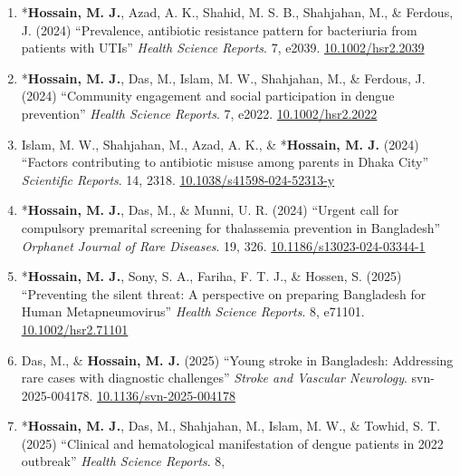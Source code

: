 \documentclass[
  11pt,
  letterpaper,
  DIV=11,
  numbers=noendperiod]{scrartcl}
\begin{document}
\begin{enumerate}
  \emph{Health Science Reports}. 7, e70259.
  \href{https://doi.org/10.1002/hsr2.70259}{10.1002/hsr2.70259}\\
\item
  *\textbf{Hossain, M. J.}, Azad, A. K., Shahid, M. S. B., Shahjahan,
  M., \& Ferdous, J. (2024) ``Prevalence, antibiotic resistance pattern
  for bacteriuria from patients with UTIs'' \emph{Health Science
  Reports}. 7, e2039.
  \href{https://doi.org/10.1002/hsr2.2039}{10.1002/hsr2.2039}\\
\item
  *\textbf{Hossain, M. J.}, Das, M., Islam, M. W., Shahjahan, M., \&
  Ferdous, J. (2024) ``Community engagement and social participation in
  dengue prevention'' \emph{Health Science Reports}. 7, e2022.
  \href{https://doi.org/10.1002/hsr2.2022}{10.1002/hsr2.2022}\\
\item
  Islam, M. W., Shahjahan, M., Azad, A. K., \& *\textbf{Hossain, M. J.}
  (2024) ``Factors contributing to antibiotic misuse among parents in
  Dhaka City'' \emph{Scientific Reports}. 14, 2318.
  \href{https://doi.org/10.1038/s41598-024-52313-y}{10.1038/s41598-024-52313-y}\\
\item
  *\textbf{Hossain, M. J.}, Das, M., \& Munni, U. R. (2024) ``Urgent
  call for compulsory premarital screening for thalassemia prevention in
  Bangladesh'' \emph{Orphanet Journal of Rare Diseases}. 19, 326.
  \href{https://doi.org/10.1186/s13023-024-03344-1}{10.1186/s13023-024-03344-1}\\
\item
  *\textbf{Hossain, M. J.}, Sony, S. A., Fariha, F. T. J., \& Hossen, S.
  (2025) ``Preventing the silent threat: A perspective on preparing
  Bangladesh for Human Metapneumovirus'' \emph{Health Science Reports}.
  8, e71101.
  \href{https://doi.org/10.1002/hsr2.71101}{10.1002/hsr2.71101}\\
\item
  Das, M., \& \textbf{Hossain, M. J.} (2025) ``Young stroke in
  Bangladesh: Addressing rare cases with diagnostic challenges''
  \emph{Stroke and Vascular Neurology}. svn-2025-004178.
  \href{https://doi.org/10.1136/svn-2025-004178}{10.1136/svn-2025-004178}\\
\item
  *\textbf{Hossain, M. J.}, Das, M., Shahjahan, M., Islam, M. W., \&
  Towhid, S. T. (2025) ``Clinical and hematological manifestation of
  dengue patients in 2022 outbreak'' \emph{Health Science Reports}. 8,

\end{enumerate}
\end{document}
